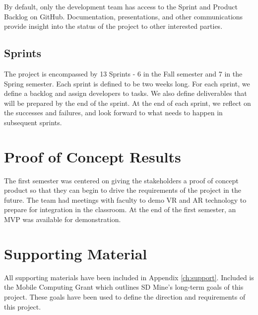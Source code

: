 By default, only the development team has access to the Sprint and Product 
Backlog on GitHub.  Documentation, presentations, and 
other communications provide insight into the status of the project to other interested parties. 

\subsection{Sprints}
The project is encompassed by 13 Sprints - 6 in the Fall semester and 7 in the 
Spring semester. Each sprint is defined to be two weeks long. 
For each sprint, we define a backlog and assign developers to tasks. We also 
define deliverables that will be prepared by the end of the sprint. At the end 
of each sprint, we reflect on the successes and failures, and look forward to 
what needs to happen in subsequent sprints.


\section{Proof of Concept Results}


The first semester was centered on giving the 
stakeholders a proof of concept product so that they can begin to drive the requirements
of the project in the future. The team had meetings with faculty to demo 
 VR and AR technology to prepare for integration in the classroom. At the end of the first semester, an MVP was available for demonstration. 

\section{Supporting Material}

All supporting materials have been included in Appendix \ref{ch:support}. Included is the Mobile Computing Grant which outlines SD Mine's long-term goals of this project. These goals have been used to define the direction and requirements of this project.
